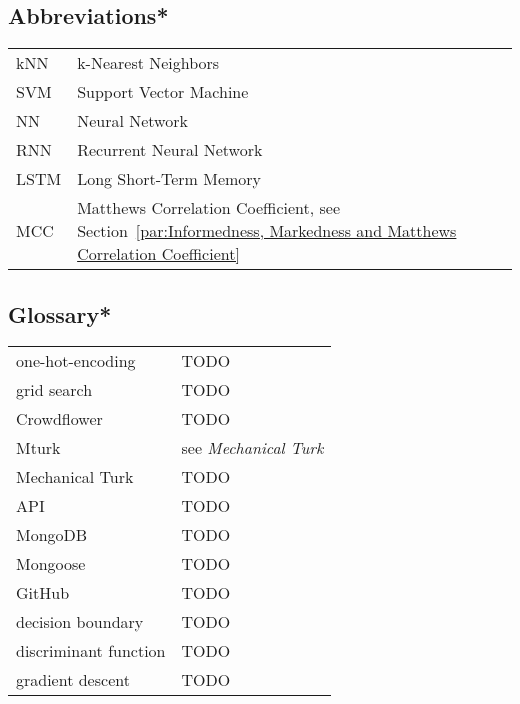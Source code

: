 

\subsection*{Abbreviations*}

\begin{tabular}{ll}
kNN & k-Nearest Neighbors \\
SVM & Support Vector Machine \\
NN & Neural Network \\
RNN & Recurrent Neural Network \\
LSTM & Long Short-Term Memory \\
MCC & Matthews Correlation Coefficient, see Section~\ref{par:Informedness, Markedness and Matthews Correlation Coefficient}
\end{tabular}

\subsection*{Glossary*}
\begin{tabular}{ll}
one-hot-encoding & TODO \\
grid search & TODO \\
Crowdflower & TODO \\
Mturk & see \emph{Mechanical Turk} \\
Mechanical Turk & TODO \\
API & TODO \\
MongoDB & TODO \\
Mongoose & TODO \\
GitHub & TODO \\
decision boundary  & TODO \\
discriminant function & TODO \\
gradient descent & TODO\\
\end{tabular}




